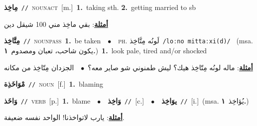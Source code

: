\documentclass[10pt,a4paper,twoside]{article} %
\begin{document}
\begin{multicols}{2}
{\setlength\topsep{0pt}\textbf{\foreignlanguage{arabic}{مِاخِذ}}\ {\color{gray}\texttt{//}\color{black}}\ \textsc{noun\textunderscore act}\ [m.]\ \textbf{1.}~taking sth.  \textbf{2.}~getting married to sb\  \begin{flushright}\color{gray}\foreignlanguage{arabic}{\textbf{\underline{\foreignlanguage{arabic}{أمثلة}}}: بقي ماخِذ مني 100 شيقل دين}\end{flushright}\color{black}} \vspace{2mm}

{\setlength\topsep{0pt}\textbf{\foreignlanguage{arabic}{مِتَّاخِذ}}\ {\color{gray}\texttt{//}\color{black}}\ \textsc{noun\textunderscore pass}\ \textbf{1.}~be taken\ \ $\bullet$\ \ \textsc{ph.} \color{gray} \foreignlanguage{arabic}{لَونُه مِتَّاخِذ}\color{black}\ {\color{gray}\texttt{/{\sffamily loːno mittaːxi(d)}/}\color{black}}\ \color{gray} (msa. \foreignlanguage{arabic}{يكون شاحب، تعبان ومصدوم}~\foreignlanguage{arabic}{\textbf{١.}})\color{black}\ \textbf{1.}~look pale, tired and/or shocked\  \begin{flushright}\color{gray}\foreignlanguage{arabic}{\textbf{\underline{\foreignlanguage{arabic}{أمثلة}}}: ماله لونُه مِتّاخِذ هيك؟ ليش طمنوني شو صاير معه؟\ $\bullet$\ \  الجزدان مِتّاخِذ من مكانه}\end{flushright}\color{black}} \vspace{2mm}

{\setlength\topsep{0pt}\textbf{\foreignlanguage{arabic}{مْوَاخَذِة}}\ {\color{gray}\texttt{//}\color{black}}\ \textsc{noun}\ [f.]\ \textbf{1.}~blaming\ } \vspace{2mm}

{\setlength\topsep{0pt}\textbf{\foreignlanguage{arabic}{وَاخَذ}}\ {\color{gray}\texttt{//}\color{black}}\ \textsc{verb}\ [p.]\ \textbf{1.}~blame\ \ $\bullet$\ \ \setlength\topsep{0pt}\textbf{\foreignlanguage{arabic}{وَاخِذ}}\ {\color{gray}\texttt{//}\color{black}}\ [c.]\ \ $\bullet$\ \ \setlength\topsep{0pt}\textbf{\foreignlanguage{arabic}{يوَاخِذ}}\ {\color{gray}\texttt{//}\color{black}}\ [i.]\ \color{gray}(msa. \foreignlanguage{arabic}{يُؤاخِذ}~\foreignlanguage{arabic}{\textbf{١.}})\color{black}\  \begin{flushright}\color{gray}\foreignlanguage{arabic}{\textbf{\underline{\foreignlanguage{arabic}{أمثلة}}}: يارب لاتواخذنا! الواحد نفسه ضعيفة.}\end{flushright}\color{black}} \vspace{2mm}


\end{multicols}
\end{document}
